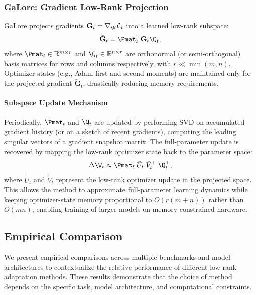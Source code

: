 \subsubsection{GaLore: Gradient Low-Rank Projection \cite{zhao2024galore}}
\label{subsubsec:galore}

GaLore projects gradients $\mathbf{G}_t=\nabla_{\W}\mathcal{L}_t$ into a learned low-rank subspace:
\begin{equation}
  \tilde{\mathbf{G}}_t = \Pmat_t^\top \mathbf{G}_t \Q_t,
\end{equation}
where $\Pmat_t\in\mathbb{R}^{m\times r}$ and $\Q_t\in\mathbb{R}^{n\times r}$ are orthonormal (or semi-orthogonal) basis matrices for rows and columns respectively, with $r\ll\min(m,n)$. Optimizer states (e.g., Adam first and second moments) are maintained only for the projected gradient $\tilde{\mathbf{G}}_t$, drastically reducing memory requirements.

\paragraph{Subspace Update Mechanism}
Periodically, $\Pmat_t$ and $\Q_t$ are updated by performing SVD on accumulated gradient history (or on a sketch of recent gradients), computing the leading singular vectors of a gradient snapshot matrix. The full-parameter update is recovered by mapping the low-rank optimizer state back to the parameter space:
\begin{equation}
  \Delta \W_t \approx \Pmat_t \;\tilde{U}_t\;\tilde{V}_t^\top\; \Q_t^\top,
\end{equation}
where $\tilde{U}_t$ and $\tilde{V}_t$ represent the low-rank optimizer update in the projected space. This allows the method to approximate full-parameter learning dynamics while keeping optimizer-state memory proportional to $O(r(m+n))$ rather than $O(mn)$, enabling training of larger models on memory-constrained hardware.

\subsection{Empirical Comparison}
\label{subsec:comparison}

We present empirical comparisons across multiple benchmarks and model architectures to contextualize the relative performance of different low-rank adaptation methods. These results demonstrate that the choice of method depends on the specific task, model architecture, and computational constraints.

